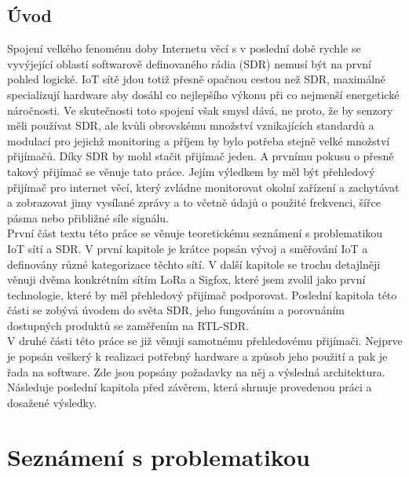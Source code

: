\documentclass{ctuthesis}
\begin{document}
\maketitle

\chapter{Úvod}
Spojení velkého fenoménu doby Internetu věcí s v poslední době rychle se vyvýjející oblastí softwarově definovaného rádia (SDR) nemusí být na první pohled logické. IoT sítě jdou totiž přesně opačnou cestou než SDR, maximálně specializují hardware aby dosáhl co nejlepšího výkonu při co nejmenší energetické náročnosti. Ve skutečnosti toto spojení však smysl dává, ne proto, že by senzory měli používat SDR, ale kvůli obrovskému množství vznikajících standardů a modulací pro jejichž monitoring a příjem by bylo potřeba stejně velké množství přijímačů. Díky SDR by mohl stačit přijímač jeden. A prvnímu pokusu o přesně takový přijímač se věnuje tato práce. Jejím výledkem by měl být přehledový přijímač pro internet věcí, který zvládne monitorovat okolní zařízení a zachytávat a zobrazovat jimy vysílané zprávy a to včetně údajů o použité frekvenci, šířce pásma nebo přibližné síle signálu.\\
První část textu této práce se věnuje teoretickému seznámení s problematikou IoT sítí a SDR. V první kapitole je krátce popsán vývoj a směřování IoT a definovány různé kategorizace těchto sítí. V další kapitole se trochu detajlněji věnuji dvěma konkrétním sítím LoRa a Sigfox, které jsem zvolil jako první technologie, které by měl přehledový přijímač podporovat. Poslední kapitola této části se zobývá úvodem do světa SDR, jeho fungováním a porovnáním dostupných produktů se zaměřením na RTL-SDR.\\
V druhé části této práce se již věnuji samotnému přehledovému přijímači. Nejprve je popsán veškerý k realizaci potřebný hardware a způsob jeho použití a pak je řada na software. Zde jsou popsány požadavky na něj a výsledná architektura. Následuje poslední kapitola před závěrem, která shrnuje provedenou práci a dosažené výsledky.

\part{Seznámení s problematikou}
\end{document}
